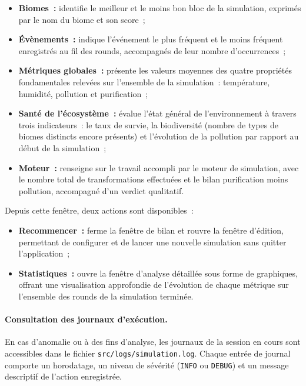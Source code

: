 \begin{itemize}
  \item \textbf{Biomes~:} identifie le meilleur et le moins bon bloc de la
        simulation, exprimés par le nom du biome et son score~;

  \item \textbf{Évènements~:} indique l'événement le plus fréquent et le moins
        fréquent enregistrés au fil des rounds, accompagnés de leur nombre
        d'occurrences~;

  \item \textbf{Métriques globales~:} présente les valeurs moyennes des quatre
        propriétés fondamentales relevées sur l'ensemble de la simulation~:
        température, humidité, pollution et purification~;
  \item \textbf{Santé de l'écosystème~:} évalue l'état général de
        l'environnement à travers trois indicateurs~: le taux de survie, la
        biodiversité (nombre de types de biomes distincts encore présents) et
        l'évolution de la pollution par rapport au début de la simulation~;

  \item \textbf{Moteur~:} renseigne sur le travail accompli par le moteur de
        simulation, avec le nombre total de transformations effectuées et le
        bilan purification moins pollution, accompagné d'un verdict qualitatif.
\end{itemize}

Depuis cette fenêtre, deux actions sont disponibles~:


\begin{itemize}
  \item \textbf{Recommencer~:} ferme la fenêtre de bilan et rouvre la fenêtre
        d'édition, permettant de configurer et de lancer une nouvelle simulation
        sans quitter l'application~;
  \item \textbf{Statistiques~:} ouvre la fenêtre d'analyse détaillée sous forme
        de graphiques, offrant une visualisation approfondie de l'évolution de
        chaque métrique sur l'ensemble des rounds de la simulation terminée.
\end{itemize}

\paragraph{Consultation des journaux d'exécution.}
En cas d'anomalie ou à des fins d'analyse, les journaux de la session en cours sont
accessibles dans le fichier \texttt{src/logs/simulation.log}. Chaque entrée de
journal comporte un horodatage, un niveau de sévérité (\texttt{INFO} ou
\texttt{DEBUG}) et un message descriptif de l'action enregistrée.
